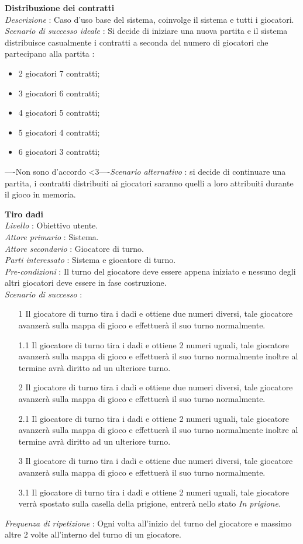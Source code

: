 \documentclass[a4paper]{article}
\begin{document}
\textbf{Distribuzione dei contratti}\\
\textit{Descrizione} : Caso d’uso base del sistema, coinvolge il sistema e tutti i giocatori.\\
\textit{Scenario di successo ideale} : Si decide di iniziare una nuova partita e il sistema distribuisce casualmente i contratti a seconda del numero di giocatori che partecipano alla partita :
\begin{itemize}
\item 2 giocatori 7 contratti;
\item 3 giocatori 6 contratti;
\item 4 giocatori 5 contratti;
\item 5 giocatori 4 contratti;
\item 6 giocatori 3 contratti;
\end{itemize}
----Non sono d'accordo <3----\textit{Scenario alternativo} : si decide di continuare una  partita, i contratti distribuiti ai giocatori saranno quelli a loro attribuiti durante il gioco in memoria.

\textbf{Tiro dadi}\\
\textit{Livello} : Obiettivo utente.\\
\textit{Attore primario} : Sistema.\\
\textit{Attore secondario} : Giocatore di turno.\\
\textit{Parti interessato} : Sistema e giocatore di turno.\\
\textit{Pre-condizioni} : Il turno del giocatore deve essere appena iniziato e nessuno degli altri giocatori deve essere in fase costruzione.\\
\textit{Scenario di successo} :
\begin{enumerate}
\item [1] Il giocatore di turno tira i dadi e ottiene due numeri diversi, tale giocatore avanzerà sulla mappa di gioco e effettuerà il suo turno normalmente.
\item [1.1] Il giocatore di turno tira i dadi e ottiene 2 numeri uguali, tale giocatore avanzerà sulla mappa di gioco e effettuerà il suo turno normalmente inoltre al termine avrà diritto ad un ulteriore turno.
 \item [2] Il giocatore di turno tira i dadi e ottiene due numeri diversi, tale giocatore avanzerà sulla mappa di gioco e effettuerà il suo turno normalmente.
\item [2.1] Il giocatore di turno tira i dadi e ottiene 2 numeri uguali, tale giocatore avanzerà sulla mappa di gioco e effettuerà il suo turno normalmente inoltre al termine avrà diritto ad un ulteriore turno.
\item [3] Il giocatore di turno tira i dadi e ottiene due numeri diversi, tale giocatore avanzerà sulla mappa di gioco e effettuerà il suo turno normalmente.
\item [3.1] Il giocatore di turno tira i dadi e ottiene 2 numeri uguali, tale giocatore  verrà spostato sulla casella della prigione, entrerà nello stato \textit{In prigione}.
\end{enumerate}
\textit{Frequenza di ripetizione} : Ogni volta all'inizio del turno del giocatore e massimo altre 2 volte all'interno del turno di un giocatore.
\end{document}
